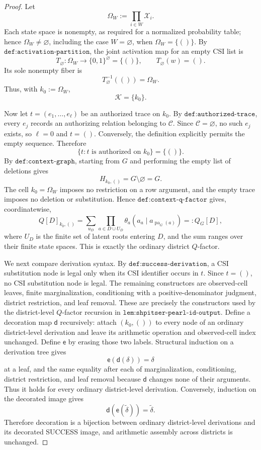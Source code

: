 \documentclass{article}
\begin{document}
\begin{proof}
Let
\[
  \Omega_W:=\prod_{i\in W}\mathcal X_i .
\]
Each state space is nonempty, as required for a normalized probability table; hence \(\Omega_W\neq\varnothing\), including the case \(W=\varnothing\), when \(\Omega_W=\{()\}\).  By \(\texttt{def:activation-partition}\), the joint activation map for an empty CSI list is
\[
  T_{\varnothing}:\Omega_W\longrightarrow \{0,1\}^{\varnothing}=\{()\},
  \qquad T_{\varnothing}(w)=().
\]
Its sole nonempty fiber is
\[
  T_{\varnothing}^{-1}(())=\Omega_W.
\]
Thus, with \(k_0:=\Omega_W\),
\[
  \mathcal K=\{k_0\}.
\]

Now let \(t=(e_1,\ldots,e_\ell)\) be an authorized trace on \(k_0\).  By \(\texttt{def:authorized-trace}\), every \(e_j\) records an authorizing relation belonging to \(\mathcal C\).  Since \(\mathcal C=\varnothing\), no such \(e_j\) exists, so \(\ell=0\) and \(t=()\).  Conversely, the definition explicitly permits the empty sequence.  Therefore
\[
  \{t:t\text{ is authorized on }k_0\}=\{()\}.
\]
By \(\texttt{def:context-graph}\), starting from \(G\) and performing the empty list of deletions gives
\[
  H_{k_0,()}=G\setminus\varnothing=G.
\]
The cell \(k_0=\Omega_W\) imposes no restriction on a row argument, and the empty trace imposes no deletion or substitution.  Hence \(\texttt{def:context-q-factor}\) gives, coordinatewise,
\[
  Q[D]_{k_0,()}
  =
  \sum_{u_D}
  \prod_{a\in D\cup U_D}
  \theta_a\!\left(a_a\mid a_{\operatorname{pa}_G(a)}\right)
  =:Q_G[D],
\]
where \(U_D\) is the finite set of latent roots entering \(D\), and the sum ranges over their finite state spaces.  This is exactly the ordinary district \(Q\)-factor.

We next compare derivation syntax.  By \(\texttt{def:success-derivation}\), a CSI substitution node is legal only when its CSI identifier occurs in \(t\).  Since \(t=()\), no CSI substitution node is legal.  The remaining constructors are observed-cell leaves, finite marginalization, conditioning with a positive-denominator judgment, district restriction, and leaf removal.  These are precisely the constructors used by the district-level \(Q\)-factor recursion in \(\texttt{lem:shpitser-pearl-id-output}\).  Define a decoration map \(\mathsf d\) recursively: attach \((k_0,())\) to every node of an ordinary district-level derivation and leave its arithmetic operation and observed-cell index unchanged.  Define \(\mathsf e\) by erasing those two labels.  Structural induction on a derivation tree gives
\[
  \mathsf e(\mathsf d(\delta))=\delta
\]
at a leaf, and the same equality after each of marginalization, conditioning, district restriction, and leaf removal because \(\mathsf d\) changes none of their arguments.  Thus it holds for every ordinary district-level derivation.  Conversely, induction on the decorated image gives
\[
  \mathsf d(\mathsf e(\widetilde\delta))=\widetilde\delta.
\]
Therefore decoration is a bijection between ordinary district-level derivations and its decorated SUCCESS image, and arithmetic assembly across districts is unchanged.


\end{proof}
\end{document}
